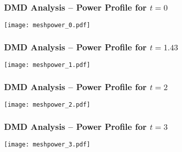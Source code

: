 \documentclass[fleqn]{beamer}
\begin{document}
\begin{frame}
\frametitle{DMD Analysis -- Power Profile for $t = 0$}

\texttt{[image: meshpower\_0.pdf]}

\end{frame}

% 
% 

\begin{frame}
\frametitle{DMD Analysis -- Power Profile for $t = 1.43$}

\texttt{[image: meshpower\_1.pdf]}

\end{frame}

% 
% 

\begin{frame}
\frametitle{DMD Analysis -- Power Profile for $t = 2$}

\texttt{[image: meshpower\_2.pdf]}

\end{frame}

% 
% 

\begin{frame}
\frametitle{DMD Analysis -- Power Profile for $t = 3$}

\texttt{[image: meshpower\_3.pdf]}
 
\end{frame}
\end{document}
